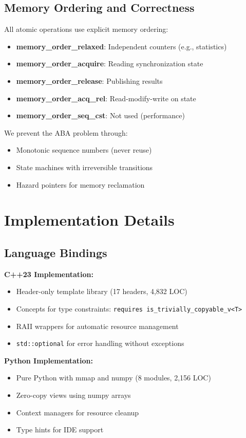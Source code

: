 \documentclass[letterpaper,twocolumn,10pt]{article}
\begin{document}
\subsection{Memory Ordering and Correctness}

All atomic operations use explicit memory ordering:

\begin{itemize}
\item \textbf{memory\_order\_relaxed}: Independent counters (e.g., statistics)
\item \textbf{memory\_order\_acquire}: Reading synchronization state
\item \textbf{memory\_order\_release}: Publishing results
\item \textbf{memory\_order\_acq\_rel}: Read-modify-write on state
\item \textbf{memory\_order\_seq\_cst}: Not used (performance)
\end{itemize}

We prevent the ABA problem through:
\begin{itemize}
\item Monotonic sequence numbers (never reuse)
\item State machines with irreversible transitions
\item Hazard pointers for memory reclamation
\end{itemize}

\section{Implementation Details}

\subsection{Language Bindings}

\textbf{C++23 Implementation:}
\begin{itemize}
\item Header-only template library (17 headers, 4,832 LOC)
\item Concepts for type constraints: \texttt{requires is\_trivially\_copyable\_v<T>}
\item RAII wrappers for automatic resource management
\item \texttt{std::optional} for error handling without exceptions
\end{itemize}

\textbf{Python Implementation:}
\begin{itemize}
\item Pure Python with mmap and numpy (8 modules, 2,156 LOC)
\item Zero-copy views using numpy arrays
\item Context managers for resource cleanup
\item Type hints for IDE support
\end{itemize}
\end{document}
